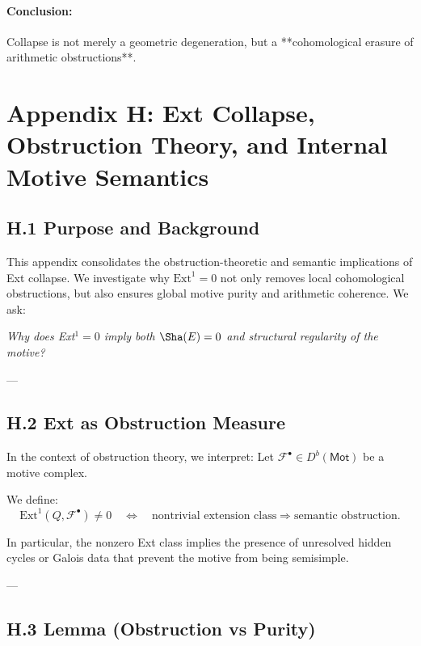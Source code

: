 \paragraph{Conclusion:}  
Collapse is not merely a geometric degeneration, but a **cohomological erasure of arithmetic obstructions**.



\section*{Appendix H: Ext Collapse, Obstruction Theory, and Internal Motive Semantics}

\subsection*{H.1 Purpose and Background}

This appendix consolidates the obstruction-theoretic and semantic implications of Ext collapse.  
We investigate why \( \mathrm{Ext}^1 = 0 \) not only removes local cohomological obstructions, but also ensures global motive purity and arithmetic coherence.  
We ask:

\begin{center}
\textit{Why does Ext$^1 = 0$ imply both $\Sha(E) = 0$ and structural regularity of the motive?}
\end{center}

---

\subsection*{H.2 Ext as Obstruction Measure}

In the context of obstruction theory, we interpret:
Let \( \mathcal{F}^\bullet \in D^b(\mathsf{Mot}) \) be a motive complex.

\begin{definition}
We define:
\[
\mathrm{Ext}^1(Q, \mathcal{F}^\bullet) \neq 0 \quad \Leftrightarrow \quad 
\text{nontrivial extension class} \Rightarrow \text{semantic obstruction}.
\]
\end{definition}

In particular, the nonzero Ext class implies the presence of unresolved hidden cycles or Galois data  
that prevent the motive from being semisimple.

---

\subsection*{H.3 Lemma (Obstruction vs Purity)}

